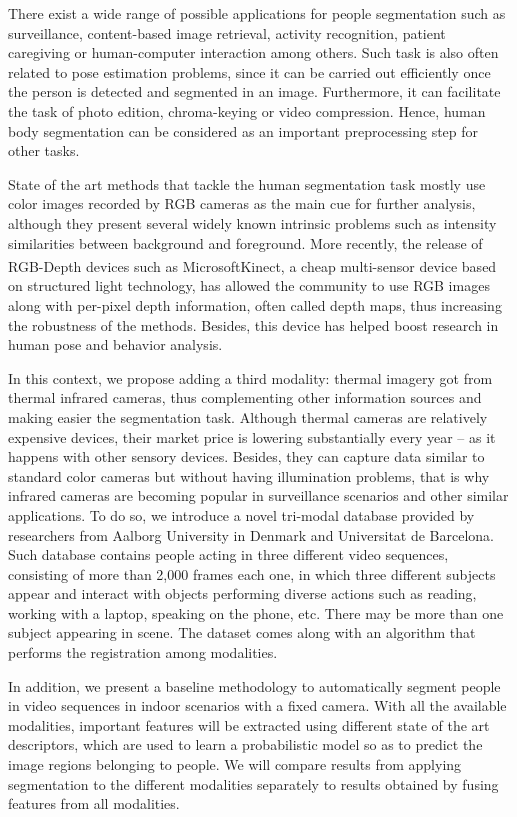 \documentclass[10pt,twocolumn,letterpaper]{article}
\begin{document}
There exist a wide range of possible applications for people segmentation such as surveillance, content-based image retrieval, activity recognition, patient caregiving or human-computer interaction among others. Such task is also often related to pose estimation problems, since it can be carried out efficiently once the person is detected and segmented in an image. Furthermore, it can facilitate the task of photo edition, chroma-keying or video compression. Hence, human body segmentation can be considered as an important preprocessing step for other tasks.

State of the art methods that tackle the human segmentation task mostly use color images recorded by RGB cameras as the main cue for further analysis, although they present several widely known intrinsic problems such as intensity similarities between background and foreground. More recently, the release of RGB-Depth devices such as Microsoft\textsuperscript\textregistered Kinect\textsuperscript\texttrademark , a cheap multi-sensor device based on structured light technology, has allowed the community to use RGB images along with per-pixel depth information, often called depth maps, thus increasing the robustness of the methods. Besides, this device has helped boost research in human pose and behavior analysis.

In this context, we propose adding a third modality: thermal imagery got from thermal infrared cameras, thus complementing other information sources and making easier the segmentation task. Although thermal cameras are relatively expensive devices, their market price is lowering substantially every year -- as it happens with other sensory devices. Besides, they can capture data similar to standard color cameras but without having illumination problems, that is why infrared cameras are becoming popular in surveillance scenarios and other similar applications. To do so, we introduce a novel tri-modal database provided by researchers from Aalborg University in Denmark and Universitat de Barcelona. Such database contains people acting in three different video sequences, consisting of more than 2,000 frames each one, in which three different subjects appear and interact with objects performing diverse actions such as reading, working with a laptop, speaking on the phone, etc. There may be more than one subject appearing in scene. The dataset comes along with an algorithm that performs the registration among modalities. 

In addition, we present a baseline methodology to automatically segment people in video sequences in indoor scenarios with a fixed camera. With all the available modalities, important features will be extracted using different state of the art descriptors, which are used to learn a probabilistic model so as to predict the image regions belonging to people. We will compare results from applying segmentation to the different modalities separately to results obtained by fusing features from all modalities.
\end{document}
